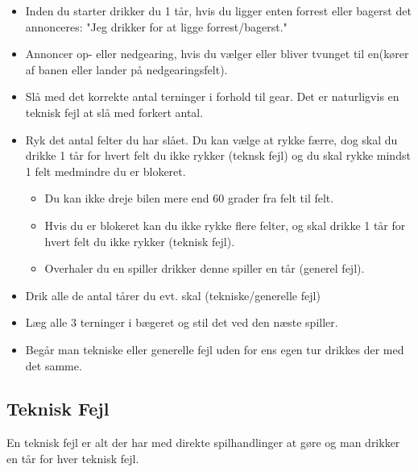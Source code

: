 \documentclass[12pt]{article}
\begin{document}
\begin{itemize}
	\item Inden du starter drikker du 1 tår, hvis du ligger enten forrest eller bagerst det annonceres: "Jeg drikker for at ligge forrest/bagerst."
	\item Annoncer op- eller nedgearing, hvis du vælger eller bliver tvunget til en(kører af banen eller lander på nedgearingsfelt).
	\item Slå med det korrekte antal terninger i forhold til gear. Det er naturligvis en teknisk fejl at slå med forkert antal.
	\item Ryk det antal felter du har slået. Du kan vælge at rykke færre, dog skal du drikke 1 tår for hvert felt du ikke rykker (teknsk fejl) og du skal rykke mindst 1 felt medmindre du er blokeret.
\begin{itemize}
		\item Du kan ikke dreje bilen mere end 60 grader fra felt til felt.
		\item Hvis du er blokeret kan du ikke rykke flere felter, og skal drikke 1 tår for hvert felt du ikke rykker (teknisk fejl).
		\item Overhaler du en spiller drikker denne spiller en tår (generel fejl).
\end{itemize}
	\item Drik alle de antal tårer du evt. skal (tekniske/generelle fejl)
	\item Læg alle 3 terninger i bægeret og stil det ved den næste spiller.
	\item Begår man tekniske eller generelle fejl uden for ens egen tur drikkes der med det samme.
\end{itemize}


\newpage


\subsection*{Teknisk Fejl}

En teknisk fejl er alt der har med direkte spilhandlinger at gøre og man drikker en tår for hver teknisk fejl.
\end{document}

